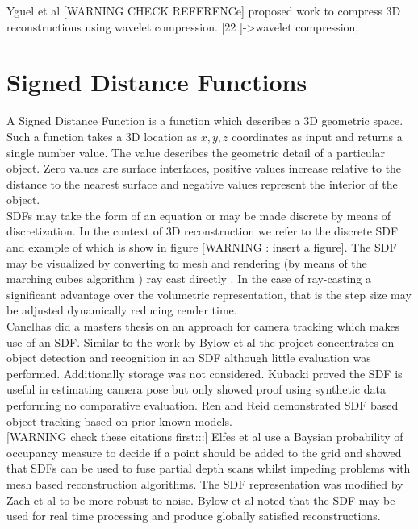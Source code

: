 Yguel et al [WARNING CHECK REFERENCe] proposed work to compress 3D reconstructions using wavelet compression.
[22 \cite{Yguel07Dense}]->wavelet compression, 


\section{Signed Distance Functions}

A Signed Distance Function \cite{Curless96Volumetric} is a function which describes a 3D geometric space. Such a function takes a 3D location as $x,y,z$ coordinates as input and returns a single number value. The value describes the geometric detail of a particular object. Zero values are surface interfaces, positive values increase relative to the distance to the nearest surface and negative values represent the interior of the object. \\

SDFs may take the form of an equation or may be made discrete by means of discretization. In the context of 3D reconstruction we refer to the discrete SDF and example of which is show in figure [WARNING : insert a figure]. The SDF may be visualized by converting to mesh and rendering (by means of the marching cubes algorithm \cite{Cubes87High}) ray cast directly \cite{Parker98Interactive}. In the case of ray-casting a significant advantage over the volumetric representation, that is the step size may be adjusted dynamically reducing render time. \\

Canelhas \cite{Canelhas12Scene} did a masters thesis on an approach for camera tracking which makes use of an SDF. Similar to the work by Bylow et al \cite{Bylow13Real} the project concentrates on object detection and recognition in an SDF although little evaluation was performed. Additionally storage was not considered. Kubacki \cite{Kubacki12Registration} proved the SDF is useful in estimating camera pose but only showed proof using synthetic data performing no comparative evaluation. Ren and Reid \cite{Ren12Unified}  demonstrated SDF based object tracking based on prior known models. \\

[WARNING check these citations first:::]
Elfes et al \cite{Elfes87Sensor} use a Baysian probability of occupancy measure to decide if a point should be added to the grid and showed that SDFs can be used to fuse partial depth scans whilst impeding problems with mesh based reconstruction algorithms. The SDF representation was modified by Zach et al \cite{Zach07Globally} to be more robust to noise. Bylow et al noted that the SDF may be used for real time processing and produce globally satisfied reconstructions.


